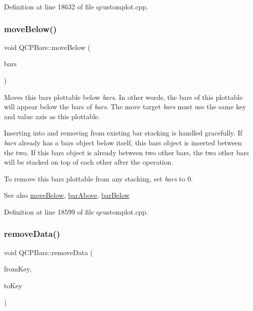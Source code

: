 Definition at line 18632 of file qcustomplot.\+cpp.

\mbox{\label{class_q_c_p_bars_a69fc371346980f19177c3d1ecdad78ee}} 
\subsubsection{\texorpdfstring{move\+Below()}{moveBelow()}}
{\footnotesize\ttfamily void Q\+C\+P\+Bars\+::move\+Below (\begin{DoxyParamCaption}\item[{\hyperlink{class_q_c_p_bars}{Q\+C\+P\+Bars} $\ast$}]{bars }\end{DoxyParamCaption})}

Moves this bars plottable below {\itshape bars}. In other words, the bars of this plottable will appear below the bars of {\itshape bars}. The move target {\itshape bars} must use the same key and value axis as this plottable.

Inserting into and removing from existing bar stacking is handled gracefully. If {\itshape bars} already has a bars object below itself, this bars object is inserted between the two. If this bars object is already between two other bars, the two other bars will be stacked on top of each other after the operation.

To remove this bars plottable from any stacking, set {\itshape bars} to 0.

\begin{DoxySeeAlso}{See also}
\hyperlink{class_q_c_p_bars_a69fc371346980f19177c3d1ecdad78ee}{move\+Below}, \hyperlink{class_q_c_p_bars_ab97f2acd9f6cb40d2cc3c33d278f0e78}{bar\+Above}, \hyperlink{class_q_c_p_bars_a1b58664864b141f45e02044a855b3213}{bar\+Below} 
\end{DoxySeeAlso}


Definition at line 18599 of file qcustomplot.\+cpp.

\mbox{\label{class_q_c_p_bars_a1fe9bcb57d670defea1bb65cadf43765}} 
\subsubsection{\texorpdfstring{remove\+Data()}{removeData()}\hspace{0.1cm}{\footnotesize\ttfamily [1/2]}}
{\footnotesize\ttfamily void Q\+C\+P\+Bars\+::remove\+Data (\begin{DoxyParamCaption}\item[{double}]{from\+Key,  }\item[{double}]{to\+Key }\end{DoxyParamCaption})}

